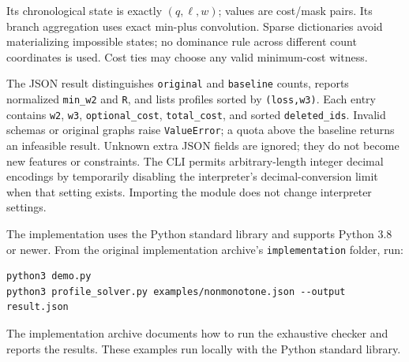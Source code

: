 \documentclass[11pt]{article}
\theoremstyle{remark}
\begin{document}
Its chronological state is exactly $(q,\ell,w)$; values are cost/mask pairs.
Its branch aggregation uses exact min-plus convolution. Sparse dictionaries
avoid materializing impossible states; no dominance rule across different
count coordinates is used. Cost ties may choose any valid minimum-cost witness.

The JSON result distinguishes \texttt{original} and \texttt{baseline} counts,
reports normalized \texttt{min\_w2} and \texttt{R}, and lists profiles sorted by
\texttt{(loss,w3)}. Each entry contains \texttt{w2}, \texttt{w3},
\texttt{optional\_cost}, \texttt{total\_cost}, and sorted
\texttt{deleted\_ids}. Invalid schemas or original graphs raise
\texttt{ValueError}; a quota above the baseline returns an infeasible result.
Unknown extra JSON fields are ignored; they do not become new features or
constraints. The CLI permits arbitrary-length integer decimal encodings by
temporarily disabling the interpreter's decimal-conversion limit when that
setting exists. Importing the module does not change interpreter settings.

The implementation uses the Python standard library and supports Python
3.8 or newer. From the original implementation archive's \texttt{implementation} folder, run:
\begin{lstlisting}
python3 demo.py
python3 profile_solver.py examples/nonmonotone.json --output result.json
\end{lstlisting}
The implementation archive documents how to run the exhaustive checker and
reports the results. These examples run locally with the Python standard library.





\end{document}
